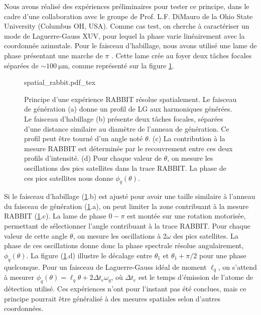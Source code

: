 Nous avons réalisé des expériences préliminaires pour tester ce principe, dans le cadre d'une collaboration avec le groupe de Prof. L.F. DiMauro de la Ohio State University (Columbus OH, USA). Comme cas test, on cherche à caractériser un mode de Laguerre-Gauss XUV, pour lequel la phase varie linéairement avec la coordonnée azimutale. Pour le faisceau d'habillage, nous avons utilisé une lame de phase présentant une marche de $\pi$ . Cette lame crée au foyer deux tâches focales séparées de $\sim \SI{100}{\micro\metre}$, comme représenté sur la figure \ref{fig:spatialrabbit}. 

\begin{figure}[!ht]
\centering
\def\svgwidth{\columnwidth}
{spatial_rabbit.pdf_tex}
\caption{Principe d'une expérience RABBIT résolue spatialement. Le faisceau de génération (a) donne un profil de LG aux harmoniques générées. Le faisceau d'habillage (b) présente deux tâches focales, séparées d'une distance similaire au diamètre de l'anneau de génération. Ce profil peut être tourné d'un angle noté $\theta$. (c) La contribution à la mesure RABBIT est déterminée par le recouvrement entre ces deux profils d'intensité. (d) Pour chaque valeur de $\theta$, on mesure les oscillations des pics satellites dans la trace RABBIT. La phase de ces pics satellites nous donne $\phi_q(\theta)$.}
\label{fig:spatialrabbit}
\end{figure}

Si le faisceau d'habillage (\ref{fig:spatialrabbit}.b) est ajusté pour avoir une taille similaire à l'anneau du faisceau de génération (\ref{fig:spatialrabbit}.a), on peut limiter la zone contribuant à la mesure RABBIT (\ref{fig:spatialrabbit}.c). La lame de phase $0-\pi$ est montée sur une rotation motorisée, permettant de sélectionner l'angle contribuant à la trace RABBIT. Pour chaque valeur de cette angle $\theta$, on mesure les oscillations à 2$\omega$ des pics satellites. La phase de ces oscillations donne donc la phase spectrale résolue angulairement, $\phi_q(\theta)$. La figure (\ref{fig:spatialrabbit}.d) illustre le décalage entre $\theta_1$ et $\theta_1+\pi/2$ pour une phase quelconque. Pour un faisceau de Laguerre-Gauss idéal de moment $\ell_q$, on s'attend à mesurer $\phi_q(\theta) = \ell_q\theta+2\Delta t_e\omega_q$, où $\Delta t_e$ est le temps d'émission de l'atome de détection utilisé. Ces expériences n'ont pour l'instant pas été conclues, mais ce principe pourrait être généralisé à des mesures spatiales selon d'autres coordonnées.

